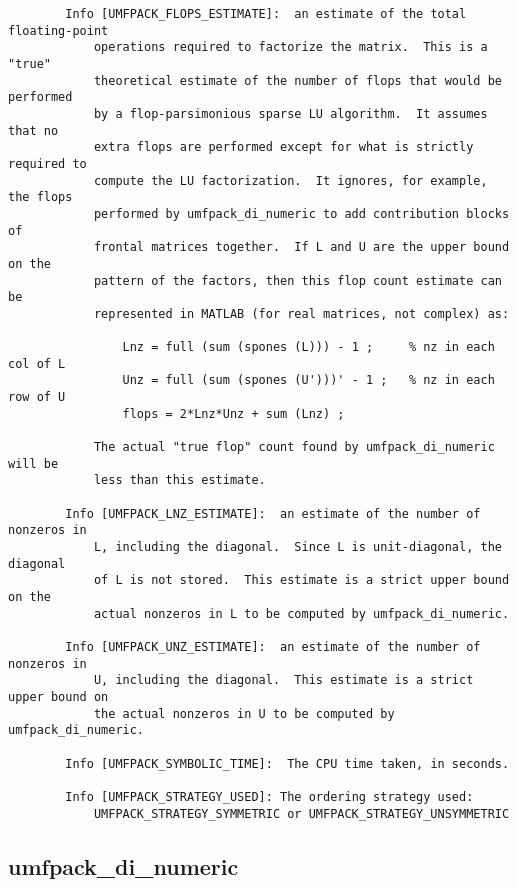 \documentclass[11pt]{article}
\begin{document}
{\begin{verbatim}
        Info [UMFPACK_FLOPS_ESTIMATE]:  an estimate of the total floating-point
            operations required to factorize the matrix.  This is a "true"
            theoretical estimate of the number of flops that would be performed
            by a flop-parsimonious sparse LU algorithm.  It assumes that no
            extra flops are performed except for what is strictly required to
            compute the LU factorization.  It ignores, for example, the flops
            performed by umfpack_di_numeric to add contribution blocks of
            frontal matrices together.  If L and U are the upper bound on the
            pattern of the factors, then this flop count estimate can be
            represented in MATLAB (for real matrices, not complex) as:

                Lnz = full (sum (spones (L))) - 1 ;     % nz in each col of L
                Unz = full (sum (spones (U')))' - 1 ;   % nz in each row of U
                flops = 2*Lnz*Unz + sum (Lnz) ;

            The actual "true flop" count found by umfpack_di_numeric will be
            less than this estimate.

        Info [UMFPACK_LNZ_ESTIMATE]:  an estimate of the number of nonzeros in
            L, including the diagonal.  Since L is unit-diagonal, the diagonal
            of L is not stored.  This estimate is a strict upper bound on the
            actual nonzeros in L to be computed by umfpack_di_numeric.

        Info [UMFPACK_UNZ_ESTIMATE]:  an estimate of the number of nonzeros in
            U, including the diagonal.  This estimate is a strict upper bound on
            the actual nonzeros in U to be computed by umfpack_di_numeric.

        Info [UMFPACK_SYMBOLIC_TIME]:  The CPU time taken, in seconds.

        Info [UMFPACK_STRATEGY_USED]: The ordering strategy used:
            UMFPACK_STRATEGY_SYMMETRIC or UMFPACK_STRATEGY_UNSYMMETRIC
\end{verbatim}
}


\newpage
\subsection{umfpack\_di\_numeric}
\end{document}
